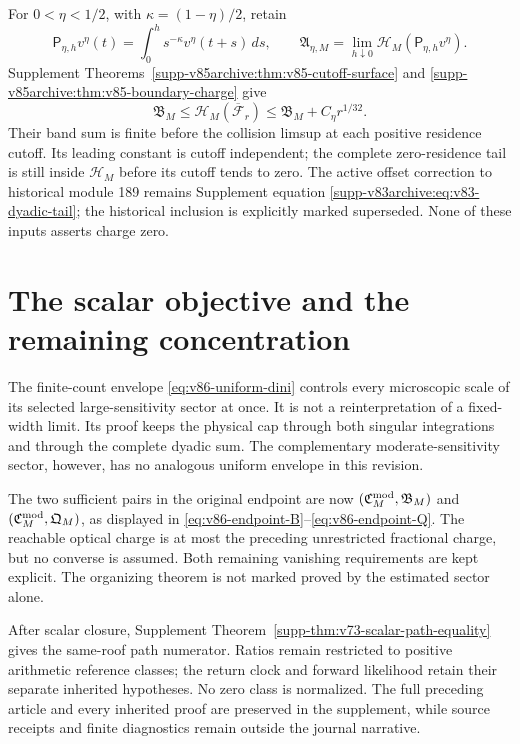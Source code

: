 \documentclass[11pt,reqno]{amsart}
\numberwithin{equation}{section}
\theoremstyle{definition}
\theoremstyle{remark}\newtheorem{remark}[theorem]{Remark}
\begin{document}
For $0<\eta<1/2$, with $\kappa=(1-\eta)/2$, retain
\[
 \mathsf P_{\eta,h}v^\eta(t)=\int_0^h s^{-\kappa}v^\eta(t+s)\,ds,
 \qquad\mathfrak A_{\eta,M}
       =\lim_{h\downarrow0}\mathcal H_M(\mathsf P_{\eta,h}v^\eta).
\]
Supplement Theorems~\ref{supp-v85archive:thm:v85-cutoff-surface}
and \ref{supp-v85archive:thm:v85-boundary-charge} give
\begin{equation}\label{eq:v86-surface-input}
 \mathfrak B_M\le\mathcal H_M(\overline{\mathcal F}_r)
                         \le\mathfrak B_M+C_\eta r^{1/32}.
\end{equation}
Their band sum is finite before the collision limsup at each positive
residence cutoff. Its leading constant is cutoff independent; the
complete zero-residence tail is still inside $\mathcal H_M$ before
its cutoff tends to zero. The active offset correction to historical
module 189 remains Supplement equation
\eqref{supp-v83archive:eq:v83-dyadic-tail}; the historical inclusion is
explicitly marked superseded. None of these inputs asserts charge zero.





\section{The scalar objective and the remaining concentration}
The finite-count envelope \eqref{eq:v86-uniform-dini} controls every
microscopic scale of its selected large-sensitivity sector at once.
It is not a reinterpretation of a fixed-width limit. Its proof keeps
the physical cap through both singular integrations and through the
complete dyadic sum. The complementary moderate-sensitivity sector,
however, has no analogous uniform envelope in this revision.

The two sufficient pairs in the original endpoint are now
$(\mathfrak C_M^{\rm mod},\mathfrak B_M)$ and
$(\mathfrak C_M^{\rm mod},\mathfrak Q_M)$, as displayed in
\eqref{eq:v86-endpoint-B}--\eqref{eq:v86-endpoint-Q}.
The reachable optical charge is at most the preceding unrestricted
fractional charge, but no converse is assumed. Both remaining
vanishing requirements are kept explicit. The organizing theorem
is not marked proved by the estimated sector alone.

After scalar closure, Supplement
Theorem~\ref{supp-thm:v73-scalar-path-equality} gives the same-roof
path numerator. Ratios remain restricted to positive arithmetic
reference classes; the return clock and forward likelihood retain
their separate inherited hypotheses. No zero class is normalized.
The full preceding article and every inherited proof are preserved
in the supplement, while source receipts and finite diagnostics remain
outside the journal narrative.

\appendix

\begingroup
\small
\enlargethispage{2\baselineskip}

\endgroup
\end{document}

